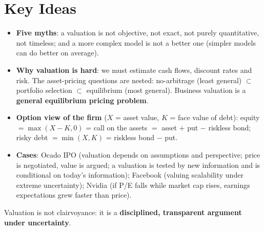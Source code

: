 \section{Key Ideas}

\begin{itemize}
  \item \textbf{Five myths}: a valuation is not objective, not exact, not purely quantitative, not timeless; and a more complex model is not a better one (simpler models can do better on average).
  \item \textbf{Why valuation is hard}: we must estimate cash flows, discount rates and risk. The asset-pricing questions are nested: no-arbitrage (least general) $\subset$ portfolio selection $\subset$ equilibrium (most general). Business valuation is a \textbf{general equilibrium pricing problem}.
  \item \textbf{Option view of the firm} ($X$ = asset value, $K$ = face value of debt): equity $=\max(X-K,0)$ = call on the assets $=$ asset $+$ put $-$ riskless bond; risky debt $=\min(X,K)$ = riskless bond $-$ put.
  \item \textbf{Cases}: Ocado IPO (valuation depends on assumptions and perspective; price is negotiated, value is argued; a valuation is tested by new information and is conditional on today's information); Facebook (valuing scalability under extreme uncertainty); Nvidia (if P/E falls while market cap rises, earnings expectations grew faster than price).
\end{itemize}

\begin{keybox}[Takeaway]
Valuation is not clairvoyance: it is a \textbf{disciplined, transparent argument under uncertainty}.
\end{keybox}
